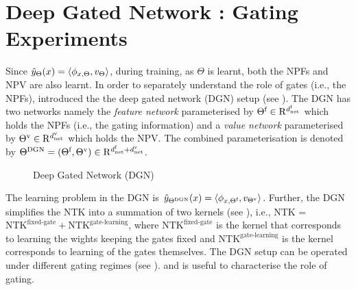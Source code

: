\section{Deep Gated Network : Gating Experiments}
Since $\hat{y}_{\Theta}(x)=\langle \phi_{x,\Theta},v_{\Theta}\rangle$, during training, as $\Theta$ is learnt, both the NPFs and NPV are also learnt. In order to separately understand the role of gates (i.e., the NPFs),  \cite{npk} introduced the the deep gated network (DGN) setup (see ).  The DGN has two networks namely the \emph{feature network} parameterised by $\Theta^{\textrm{f}}\in\mathrm{R}^{d^{\text{f}}_{\text{net}}}$ which holds the NPFs (i.e., the gating information) and a \emph{value network} parameterised by ${\Theta}^{\text{v}}\in\mathrm{R}^{d^{\text{v}}_{\text{net}}}$ which holds the NPV.  The combined parameterisation is denoted by $\Theta^{\text{DGN}}=(\Theta^{\textrm{f}},{\Theta}^{\text{v}})\in \mathrm{R}^{d^{\text{f}}_{\text{net}}+d^{\text{v}}_{\text{net}}}$.  
\FloatBarrier
\begin{figure}[h]
\caption{Deep Gated Network (DGN)}
\label{fig:dgn}
\end{figure}
The learning problem in the DGN is $\hat{y}_{\Theta^{\text{DGN}}}(x)=\langle \phi_{x,\Theta^{\textrm{f}}},v_{{\Theta}^{\text{v}}}\rangle$. Further, the DGN simplifies the NTK into a summation of two kernels (see ), i.e., NTK = $\text{NTK}^{\text{fixed-gate}}+ \text{NTK}^\text{gate-learning}$, where $\text{NTK}^{\text{fixed-gate}}$ is the kernel that corresponds to learning the wights keeping the gates fixed and $\text{NTK}^\text{gate-learning}$ is the kernel corresponds to learning of the gates themselves. The DGN setup can be operated under different gating regimes (see ). and is useful to characterise the role of gating.
